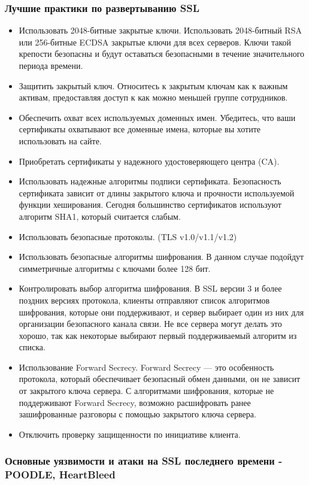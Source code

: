 \documentclass[10pt,a4paper]{article}
\begin{document}
\subsubsection{Лучшие практики по развертыванию SSL}
\begin{itemize}
\item Использовать 2048-битные закрытые ключи.
Использовать 2048-битный RSA или 256-битные ECDSA закрытые ключи для всех серверов. Ключи такой крепости безопасны и будут оставаться безопасными в течение значительного периода времени.
\item Защитить закрытый ключ. Относитесь к закрытым ключам как к важным активам, предоставляя доступ к как можно меньшей группе сотрудников.
\item Обеспечить охват всех используемых доменных имен. Убедитесь, что ваши сертификаты охватывают все доменные имена, которые вы хотите использовать на сайте.
\item Приобретать сертификаты у надежного удостоверяющего центра (CA).
\item Использовать надежные алгоритмы подписи сертификата. Безопасность сертификата зависит от длины закрытого ключа и прочности используемой функции хеширования. Сегодня большинство сертификатов используют алгоритм SHA1, который считается слабым. 
\item Использовать безопасные протоколы. (TLS v1.0/v1.1/v1.2)
\item Использовать безопасные алгоритмы шифрования. В данном случае подойдут симметричные алгоритмы с ключами более 128 бит.
\item Контролировать выбор алгоритма шифрования. В SSL версии 3 и более поздних версиях протокола, клиенты отправляют список алгоритмов шифрования, которые они поддерживают, и сервер выбирает один из них для организации безопасного канала связи. Не все сервера могут делать это хорошо, так как некоторые выбирают первый поддерживаемый алгоритм из списка.
\item Использование Forward Secrecy. Forward Secrecy — это особенность протокола, который обеспечивает безопасный обмен данными, он не зависит от закрытого ключа сервера. С алгоритмами шифрования, которые не поддерживают Forward Secrecy, возможно расшифровать ранее зашифрованные разговоры с помощью закрытого ключа сервера.
\item Отключить проверку защищенности по инициативе клиента.
\end{itemize}

\subsubsection{Основные уязвимости и атаки на SSL последнего времени - POODLE, HeartBleed}
\end{document}

